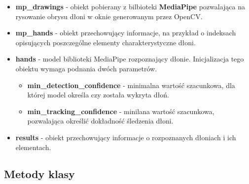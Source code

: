 \begin{itemize}
    \item \textbf{mp\_drawings} - obiekt pobierany z bilbioteki \textbf{MediaPipe} pozwalająca na rysowanie obrysu dłoni w oknie generowanym przez OpenCV.
    \item \textbf{mp\_hands} - obiekt przechowujący informacje, na przykład o indeksach opisujących poszczególne elementy charakterystyczne dłoni. 
    \item \textbf{hands} - model biblioteki MediaPipe rozpoznający dłonie. Inicjalizacja tego obiektu wymaga podnania dwóch parametrów. 
    \begin{itemize}
        \item \textbf{min\_detection\_confidence} - minimalna wartość szacunkowa, dla której model określa czy została wykryta dłoń.
        \item \textbf{min\_tracking\_confidence} - minilana wartość szacunkowa, pozwalająca określić dokładność śledzenia dłoni. 
    \end{itemize}
    \item \textbf{results} - obiekt przechowujący informacje o rozpoznanych dłoniach i ich elementach. 
\end{itemize}

\subsection{Metody klasy}

